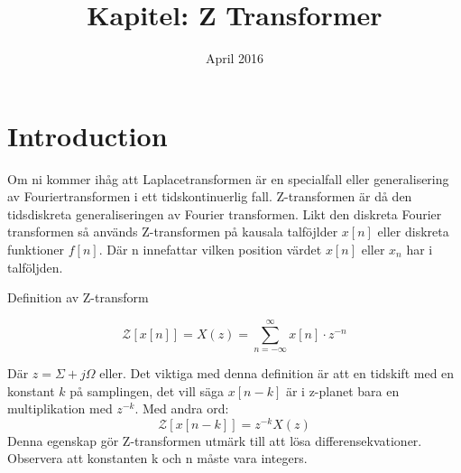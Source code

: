 \documentclass{article}
\title{Kapitel: Z Transformer}
\author{ }
\date{April 2016}
\begin{document}
\maketitle

\section{Introduction}

Om ni kommer ihåg att Laplacetransformen är en specialfall eller generalisering av Fouriertransformen i ett
tidskontinuerlig fall. Z-transformen är då den tidsdiskreta generaliseringen av Fourier transformen.
Likt den diskreta Fourier transformen så används Z-transformen på kausala talföjlder $x[n]$ eller 
diskreta funktioner $f[n]$. Där n innefattar vilken position värdet $x[n]$ eller $x_n$ har i talföljden.

Definition av Z-transform

$$\mathcal{Z}[x[n]] = X(z) = \sum_{n=-\infty}^{\infty} x[n] \cdot z^{-n} $$

Där $z = \Sigma + j\Omega$ eller. %
Det viktiga med denna definition är att en tidskift med en konstant $k$ på samplingen, det vill säga $x[n-k]$ är i
z-planet bara en multiplikation med $z^{-k}$. Med andra ord:
$$\mathcal{Z}[x[n-k]] = z^{-k} X(z) $$ 
Denna egenskap gör Z-transformen utmärk till att lösa differensekvationer. Observera att konstanten k och n 
måste vara integers.

\appendix
\end{document}
